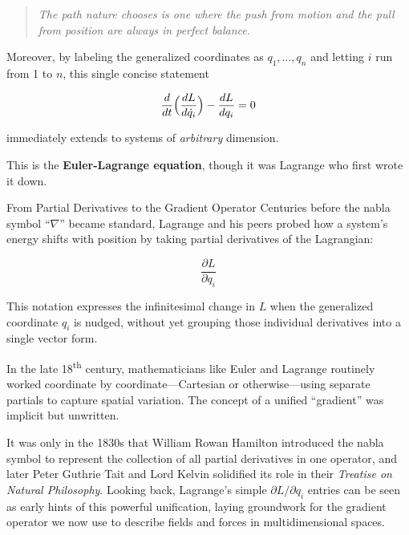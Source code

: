\begin{quote}
    \textit{The path nature chooses is one where the push from motion and the pull from position are always in perfect balance.}
\end{quote}

Moreover, by labeling the generalized coordinates as \(q_1,\dots,q_n\) and letting \(i\) run from 1 to \(n\), this single concise statement

\[
\frac{d}{dt}\Bigl(\frac{dL}{d\dot{q}_i}\Bigr)-\frac{dL}{dq_i}=0
\]

immediately extends to systems of \emph{arbitrary} dimension.  

This is the \textbf{Euler-Lagrange equation}, though it was Lagrange who first wrote it down.

\medskip

\begin{HistoricalSidebar}{From Partial Derivatives to the Gradient Operator}
    Centuries before the nabla symbol “\(\nabla\)” became standard, Lagrange and his peers probed how a system’s energy shifts with position by taking partial derivatives of the Lagrangian:
    
    \[
    \frac{\partial L}{\partial q_i}
    \]
    
    This notation expresses the infinitesimal change in \(L\) when the generalized coordinate \(q_i\) is nudged, without yet grouping those individual derivatives into a single vector form.

    \medskip
    
    In the late 18\textsuperscript{th} century, mathematicians like Euler and Lagrange routinely worked coordinate by coordinate—Cartesian or otherwise—using separate partials to capture spatial variation.  The concept of a unified “gradient” was implicit but unwritten.

    \medskip
    
    It was only in the 1830s that William Rowan Hamilton introduced the nabla symbol to represent the collection of all partial derivatives in one operator, and later Peter Guthrie Tait and Lord Kelvin solidified its role in their \textit{Treatise on Natural Philosophy}.  Looking back, Lagrange’s simple \(\partial L/\partial q_i\) entries can be seen as early hints of this powerful unification, laying groundwork for the gradient operator we now use to describe fields and forces in multidimensional spaces.
\end{HistoricalSidebar}









